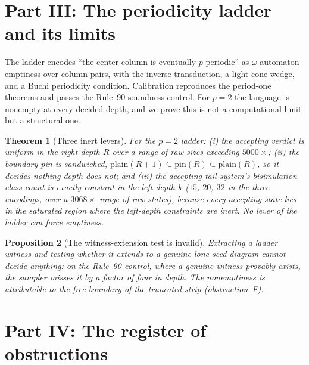 \documentclass[11pt]{article}
\newtheorem{theorem}{Theorem}[section]
\newtheorem{proposition}[theorem]{Proposition}
\theoremstyle{definition}
\begin{document}
\section{Part III: The periodicity ladder and its limits}
\label{sec:ladder}


The ladder encodes ``the center column is eventually $p$-periodic'' as
$\omega$-automaton emptiness over column pairs, with the inverse transduction, a
light-cone wedge, and a Buchi periodicity condition. Calibration reproduces the
period-one theorems and passes the Rule~90 soundness control. For $p=2$ the
language is nonempty at every decided depth, and we prove this is not a
computational limit but a structural one.

\begin{theorem}[Three inert levers]\label{thm:ladder}
For the $p=2$ ladder: (i) the accepting verdict is uniform in the right depth
$R$ over a range of raw sizes exceeding $5000\times$; (ii) the boundary pin is
sandwiched, $\mathrm{plain}(R+1)\subseteq\mathrm{pin}(R)\subseteq\mathrm{plain}(R)$,
so it decides nothing depth does not; and (iii) the accepting tail system's
bisimulation-class count is \emph{exactly constant} in the left depth $k$
($15$, $20$, $32$ in the three encodings, over a $3068\times$ range of raw
states), because every accepting state lies in the saturated region where the
left-depth constraints are inert. No lever of the ladder can force emptiness.
\end{theorem}

\begin{proposition}[The witness-extension test is invalid]\label{prop:witness}
Extracting a ladder witness and testing whether it extends to a genuine
lone-seed diagram cannot decide anything: on the Rule~90 control, where a genuine
witness provably exists, the sampler misses it by a factor of four in depth. The
nonemptiness is attributable to the free boundary of the truncated strip
(obstruction~F).
\end{proposition}

\section{Part IV: The register of obstructions}
\label{sec:register}
\end{document}
